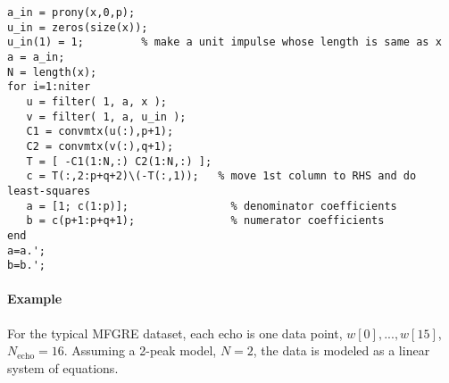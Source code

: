 \documentclass[10pt]{amsart}
\begin{document}
\begin{verbatim}
a_in = prony(x,0,p);
u_in = zeros(size(x));
u_in(1) = 1;         % make a unit impulse whose length is same as x
a = a_in;
N = length(x);
for i=1:niter
   u = filter( 1, a, x );
   v = filter( 1, a, u_in );
   C1 = convmtx(u(:),p+1);
   C2 = convmtx(v(:),q+1);
   T = [ -C1(1:N,:) C2(1:N,:) ];
   c = T(:,2:p+q+2)\(-T(:,1));   % move 1st column to RHS and do least-squares
   a = [1; c(1:p)];                % denominator coefficients
   b = c(p+1:p+q+1);               % numerator coefficients
end
a=a.';
b=b.';
\end{verbatim}

\paragraph{\textbf{Example}} For the typical MFGRE dataset, each echo is one data point,  $w[0], ..., w[15]$, $N_\text{echo}=16$. Assuming a 2-peak model, $N=2$,
the data is modeled as a linear system of equations.
\end{document}
